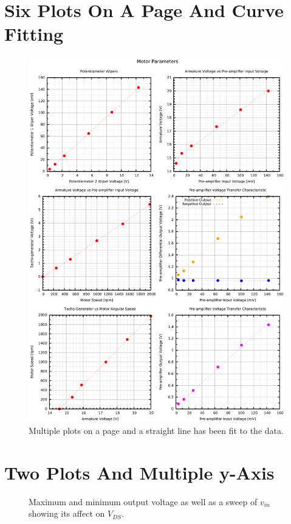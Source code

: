 \documentclass[10pt,a4paper,final]{report}
\begin{document}
\section{Six Plots On A Page And Curve Fitting}
\begin{figure}[!hbtp]
\centering
\includegraphics[width=\textwidth]{../Code/MotorGraphGnuplot/OpenLoopMotorPlots.pdf}
\caption{Multiple plots on a page and a straight line has been fit to the data.}
\end{figure}


\section{Two Plots And Multiple y-Axis}
\begin{figure}[!htbp]
\begin{center}
	\resizebox{\columnwidth}{!}{}
\caption{Maximum and minimum output voltage as well as a sweep of $v_\mathit{in}$ showing its affect on $V_\mathit{DS}$.}
\label{fig:11cTRAngle}
\end{center}
\end{figure}

\end{document}
